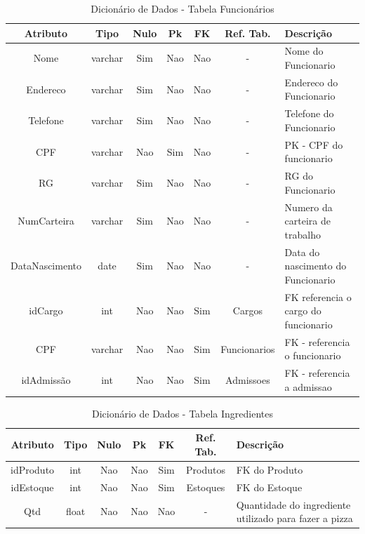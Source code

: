\documentclass[
	12pt,				%
	openright,			%
	oneside,			%
	a4paper,			%
	chapter=TITLE,		%
	section=TITLE,		%
	english,			%
	brazil				%
	]{abntex2}
\begin{document}
    \begin{table}[htbp]
    \centering
        \caption{Dicionário de Dados  - Tabela Funcionários}
        \label{tb1_dicionario_dados_funcionarios}
        \begin{tabular}{|c|c|c|c|c|c|p{3cm}|}
            \hline
            \textbf{Atributo} & 
            \textbf{Tipo} & 
            \textbf{Nulo} & 
            \textbf{Pk} & 
            \textbf{FK} & 
            \textbf{Ref. Tab.} & 
            \textbf{Descrição} \\ \hline
            Nome & varchar & Sim & Nao & Nao & - & Nome do Funcionario \\ \hline
            Endereco & varchar & Sim & Nao & Nao & - & Endereco do Funcionario \\ \hline
            Telefone & varchar & Sim & Nao & Nao & - & Telefone do Funcionario \\ \hline
            CPF & varchar & Nao & Sim & Nao & - & PK - CPF do funcionario \\ \hline
            RG & varchar & Sim & Nao & Nao & - & RG do Funcionario \\ \hline
            NumCarteira & varchar & Sim & Nao & Nao & - & Numero da carteira de trabalho \\ \hline
            DataNascimento & date & Sim & Nao & Nao & - & Data do nascimento do Funcionario \\ \hline
            idCargo & int & Nao & Nao & Sim & Cargos & FK referencia o cargo do funcionario \\ \hline
            CPF & varchar & Nao & Nao & Sim & Funcionarios & FK - referencia o funcionario \\ \hline
            idAdmissão & int & Nao & Nao & Sim & Admissoes & FK - referencia a admissao \\ \hline
        \end{tabular}
    \end{table}
    
    \begin{table}[htbp]
    \centering
        \caption{Dicionário de Dados - Tabela Ingredientes}
        \label{tb1_dicionario_dados_ingredientes}
        \begin{tabular}{|c|c|c|c|c|c|p{3cm}|}
            \hline
            \textbf{Atributo} & 
            \textbf{Tipo} & 
            \textbf{Nulo} & 
            \textbf{Pk} & 
            \textbf{FK} & 
            \textbf{Ref. Tab.} & 
            \textbf{Descrição} \\ \hline
            idProduto & int & Nao & Nao & Sim & Produtos & FK do Produto \\ \hline
            idEstoque & int & Nao & Nao & Sim & Estoques & FK do Estoque \\ \hline
            Qtd & float & Nao & Nao & Nao & - & Quantidade do ingrediente utilizado para fazer a pizza \\ \hline
        \end{tabular}
    \end{table}
    
\end{document}

